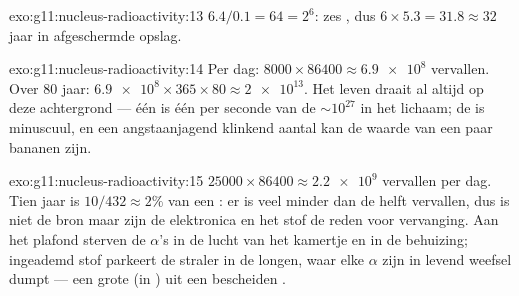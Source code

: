 \begin{solution}{exo:g11:nucleus-radioactivity:13}
$6.4/0.1 = 64 = 2^{6}$: zes , dus
$6 \times 5.3 = 31.8 \approx 32$ jaar in afgeschermde opslag.
\end{solution}

\begin{solution}{exo:g11:nucleus-radioactivity:14}
Per dag: $8000 \times 86400 \approx \num{6.9e8}$ vervallen. Over $80$
jaar: $\num{6.9e8} \times 365 \times 80 \approx \num{2e13}$. Het leven
draait al altijd op deze achtergrond --- één  is één  per
seconde van de $\sim 10^{27}$ in het lichaam; de  is minuscuul, en
een angstaanjagend klinkend aantal  kan de waarde van een paar
bananen zijn.
\end{solution}

\begin{solution}{exo:g11:nucleus-radioactivity:15}
$\num{25000} \times 86400 \approx \num{2.2e9}$ vervallen per dag. Tien
jaar is $10/432 \approx 2\%$ van een : er is veel minder
dan de helft vervallen, dus is niet de bron maar zijn de elektronica en
het stof de reden voor vervanging. Aan het plafond sterven de $\alpha$'s
in de lucht van het kamertje en in de behuizing; ingeademd stof parkeert
de straler in de longen, waar elke $\alpha$ zijn  in levend
weefsel dumpt --- een grote  (in ) uit een bescheiden
.
\end{solution}

